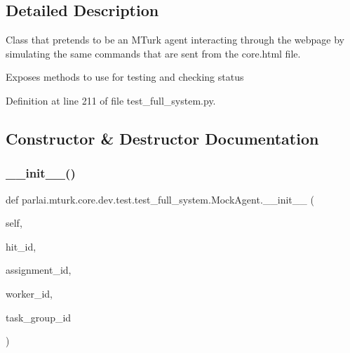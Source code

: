 \subsection{Detailed Description}
\begin{DoxyVerb}Class that pretends to be an MTurk agent interacting through the webpage by
simulating the same commands that are sent from the core.html file.

Exposes methods to use for testing and checking status
\end{DoxyVerb}
 

Definition at line 211 of file test\+\_\+full\+\_\+system.\+py.



\subsection{Constructor \& Destructor Documentation}
\mbox{\label{classparlai_1_1mturk_1_1core_1_1dev_1_1test_1_1test__full__system_1_1MockAgent_ae2c5906fb77600feb2d4c8d1ede4e415}} 
\subsubsection{\texorpdfstring{\+\_\+\+\_\+init\+\_\+\+\_\+()}{\_\_init\_\_()}}
{\footnotesize\ttfamily def parlai.\+mturk.\+core.\+dev.\+test.\+test\+\_\+full\+\_\+system.\+Mock\+Agent.\+\_\+\+\_\+init\+\_\+\+\_\+ (\begin{DoxyParamCaption}\item[{}]{self,  }\item[{}]{hit\+\_\+id,  }\item[{}]{assignment\+\_\+id,  }\item[{}]{worker\+\_\+id,  }\item[{}]{task\+\_\+group\+\_\+id }\end{DoxyParamCaption})}




